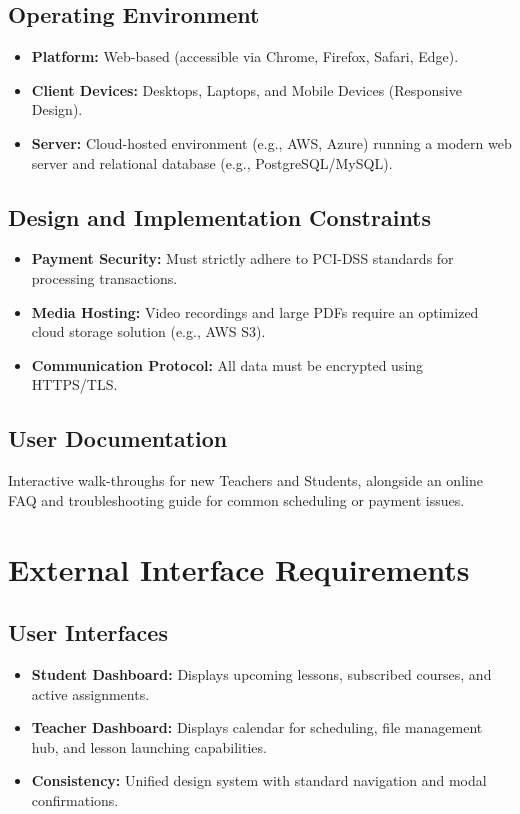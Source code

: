 \documentclass[11pt,a4paper]{article}
\begin{document}
\subsection{Operating Environment}
\begin{itemize}
    \item \textbf{Platform:} Web-based (accessible via Chrome, Firefox, Safari, Edge).
    \item \textbf{Client Devices:} Desktops, Laptops, and Mobile Devices (Responsive Design).
    \item \textbf{Server:} Cloud-hosted environment (e.g., AWS, Azure) running a modern web server and relational database (e.g., PostgreSQL/MySQL).
\end{itemize}

\subsection{Design and Implementation Constraints}
\begin{itemize}
    \item \textbf{Payment Security:} Must strictly adhere to PCI-DSS standards for processing transactions.
    \item \textbf{Media Hosting:} Video recordings and large PDFs require an optimized cloud storage solution (e.g., AWS S3).
    \item \textbf{Communication Protocol:} All data must be encrypted using HTTPS/TLS.
\end{itemize}

\subsection{User Documentation}
Interactive walk-throughs for new Teachers and Students, alongside an online FAQ and troubleshooting guide for common scheduling or payment issues.

\section{External Interface Requirements}

\subsection{User Interfaces}
\begin{itemize}
    \item \textbf{Student Dashboard:} Displays upcoming lessons, subscribed courses, and active assignments.
    \item \textbf{Teacher Dashboard:} Displays calendar for scheduling, file management hub, and lesson launching capabilities.
    \item \textbf{Consistency:} Unified design system with standard navigation and modal confirmations.
\end{itemize}
\end{document}

